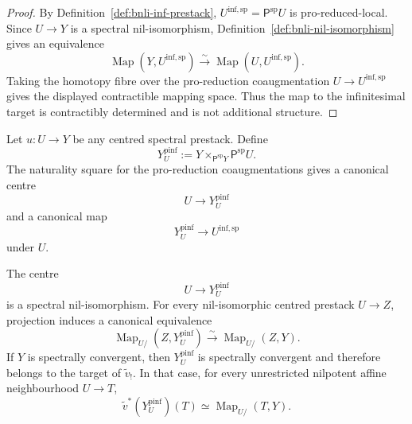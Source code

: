 \begin{proof}
By Definition~\ref{def:bnli-inf-prestack},
$U^{\mathrm{inf,sp}}=\mathsf P^{\mathrm{sp}}U$ is pro-reduced-local.  Since
$U\to Y$ is a spectral nil-isomorphism,
Definition~\ref{def:bnli-nil-isomorphism} gives an equivalence
\[
    \operatorname{Map}(Y,U^{\mathrm{inf,sp}})
    \xrightarrow{\sim}
    \operatorname{Map}(U,U^{\mathrm{inf,sp}}).
\]
Taking the homotopy fibre over the pro-reduction coaugmentation
$U\to U^{\mathrm{inf,sp}}$ gives the displayed contractible mapping space.
Thus the map to the infinitesimal target is contractibly determined and is
not additional structure.
\end{proof}

\begin{construction}
\label{con:bnli-pro-infinitesimal-completion}
Let $u:U\to Y$ be any centred spectral prestack.  Define
\[
\boxed{
    Y_U^{\mathrm{pinf}}
    :=
    Y\times_{\mathsf P^{\mathrm{sp}}Y}
    \mathsf P^{\mathrm{sp}}U.}
\]
The naturality square for the pro-reduction coaugmentations gives a canonical
centre
\[
    U\longrightarrow Y_U^{\mathrm{pinf}}
\]
and a canonical map
\[
    Y_U^{\mathrm{pinf}}\longrightarrow U^{\mathrm{inf,sp}}
\]
under $U$.
\end{construction}

\begin{proposition}
\label{prop:bnli-pro-infinitesimal-universal}
The centre
\[
    U\longrightarrow Y_U^{\mathrm{pinf}}
\]
is a spectral nil-isomorphism.  For every nil-isomorphic centred prestack
$U\to Z$, projection induces a canonical equivalence
\[
\boxed{
    \operatorname{Map}_{U/}
    (Z,Y_U^{\mathrm{pinf}})
    \xrightarrow{\sim}
    \operatorname{Map}_{U/}(Z,Y).}
\]
If $Y$ is spectrally convergent, then $Y_U^{\mathrm{pinf}}$ is spectrally
convergent and therefore belongs to the target of
$\widetilde v_!$.  In that case, for every unrestricted nilpotent affine
neighbourhood $U\to T$,
\[
\boxed{
    \widetilde v^*
    \left(
      Y_U^{\mathrm{pinf}}
    \right)(T)
    \simeq
    \operatorname{Map}_{U/}(T,Y).}
\]
\end{proposition}

